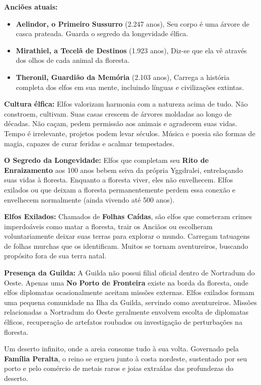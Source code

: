 \textbf{\ringmfamily Anciões atuais:}
\begin{itemize}
    \item \textbf{\ringmfamily Aelindor, o Primeiro Sussurro} (2.247 anos), Seu corpo é uma árvore de casca prateada. Guarda o segredo da longevidade élfica.
    \item \textbf{\ringmfamily Mirathiel, a Tecelã de Destinos} (1.923 anos), Diz-se que ela vê através dos olhos de cada animal da floresta.
    \item \textbf{\ringmfamily Theronil, Guardião da Memória} (2.103 anos), Carrega a história completa dos elfos em sua mente, incluindo línguas e civilizações extintas.
\end{itemize}

\textbf{\ringmfamily Cultura élfica:} Elfos valorizam harmonia com a natureza acima de tudo. Não constroem, cultivam. Suas casas crescem de árvores moldadas ao longo de décadas. Não caçam, pedem permissão aos animais e agradecem suas vidas. Tempo é irrelevante, projetos podem levar séculos. Música e poesia são formas de magia, capazes de curar feridas e acalmar tempestades.

\textbf{\ringmfamily O Segredo da Longevidade:} Elfos que completam seu \textbf{Rito de Enraizamento} aos 100 anos bebem seiva da própria Yggdralei, entrelaçando suas vidas à floresta. Enquanto a floresta viver, eles não envelhecem. Elfos exilados ou que deixam a floresta permanentemente perdem essa conexão e envelhecem normalmente (ainda vivendo até 500 anos).

\textbf{\ringmfamily Elfos Exilados:} Chamados de \textbf{Folhas Caídas}, são elfos que cometeram crimes imperdoáveis como matar a floresta, trair os Anciãos ou escolheram voluntariamente deixar suas terras para explorar o mundo. Carregam tatuagens de folhas murchas que os identificam. Muitos se tornam aventureiros, buscando propósito fora de sua terra natal.

\textbf{\ringmfamily Presença da Guilda:} A Guilda não possui filial oficial dentro de Nortradum do Oeste. Apenas uma \textbf{No Porto de Fronteira} existe na borda da floresta, onde elfos diplomatas ocasionalmente aceitam missões externas. Elfos exilados formam uma pequena comunidade na Ilha da Guilda, servindo como aventureiros. Missões relacionadas a Nortradum do Oeste geralmente envolvem escolta de diplomatas élficos, recuperação de artefatos roubados ou investigação de perturbações na floresta.

Um deserto infinito, onde a areia consome tudo à sua volta. Governado pela \textbf{Família Peralta}, o reino se ergueu junto à costa nordeste, sustentado por seu porto e pelo comércio de metais raros e joias extraídas das profundezas do deserto.

